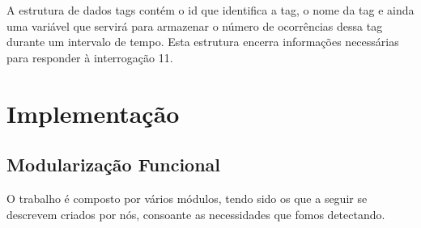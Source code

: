 \documentclass[a4paper]{article}
\begin{document}
A estrutura de dados tags contém o id que identifica a tag,
o nome da tag e ainda uma variável que servirá para armazenar
o número de ocorrências dessa tag durante um intervalo de tempo.
Esta estrutura encerra informações necessárias para responder à interrogação 11.


\section{Implementação}
\label{sec:implementacao}

\subsection{Modularização Funcional}
\label{sec:organizacao}

O trabalho é composto por vários módulos, tendo sido os que a seguir se descrevem
criados por nós, consoante as necessidades que fomos detectando.
\end{document}
